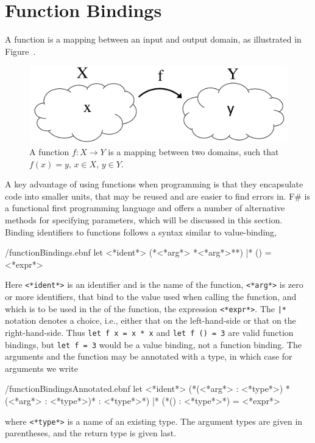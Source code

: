 \documentclass[fsharpNotes.tex]{subfiles}
\begin{document}
\section{Function Bindings}
\label{sec:functions}
A function is a mapping between an input and output domain, as illustrated in Figure~.
\begin{figure}
  \centering
  \includegraphics[width=0.6\linewidth]{functions}
  \caption{A function $f:X\rightarrow Y$ is a mapping between two domains, such that $f(x)=y,\, x\in X,\, y\in Y$.}
  \label{fig:functions}
\end{figure}
A key advantage of using functions when programming is that they encapsulate code into smaller units, that may be reused and are easier to find errors in. F\# is a functional first programming language and offers a number of alternative methods for specifying parameters, which will be discussed in this section. Binding identifiers to functions follows a syntax similar to value-binding,
%
\begin{verbatimwrite}{\ebnf/functionBindings.ebnf}
let <*ident*> (*<*arg*> {*<*arg*>*}*) |* () =
  <*expr*>
\end{verbatimwrite}
%
Here \lstinline[language=syntax]{<*ident*>} is an identifier and is the name of the function, \lstinline[language=syntax]{<*arg*>} is zero or more identifiers, that bind to the value used when calling the function, and which is to be used in the  of the function, the expression \lstinline[language=syntax]{<*expr*>}. The \lstinline[language=syntax]{|*} notation denotes a choice, i.e., either that on the left-hand-side or that on the right-hand-side. Thus \lstinline{let f x = x * x} and \lstinline{let f () = 3} are valid function bindings, but \lstinline{let f = 3} would be a value binding, not a function binding. The arguments and the function may be annotated with a type, in which case for arguments we write
%
\begin{verbatimwrite}{\ebnf/functionBindingsAnnotated.ebnf}
let <*ident*> (*(<*arg*> : <*type*>) {*(<*arg*> : <*type*>)*} : <*type*>*) |* (*() : <*type*>*) =
  <*expr*>
\end{verbatimwrite}
%
where \lstinline[language=syntax]{<*type*>} is a name of an existing type. The argument types are given in parentheses, and the return type is given last. 
\end{document}
